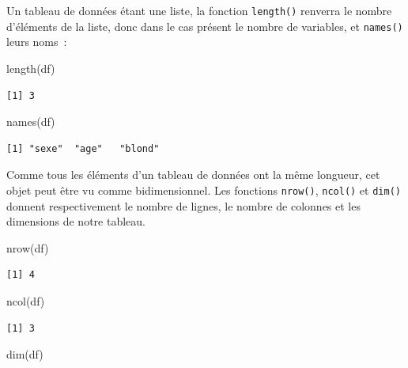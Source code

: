 \documentclass[
  letterpaper,
  DIV=11,
  numbers=noendperiod,
  oneside]{scrreprt}
\newenvironment{Shaded}{\begin{snugshade}}{\end{snugshade}}
\newcommand{\FunctionTok}[1]{\textcolor[rgb]{0.28,0.35,0.67}{#1}}
\newcommand{\NormalTok}[1]{\textcolor[rgb]{0.00,0.23,0.31}{#1}}
\begin{document}
Un tableau de données étant une liste, la fonction \texttt{length()}
renverra le nombre d'éléments de la liste, donc dans le cas présent le
nombre de variables, et \texttt{names()} leurs noms~:

\begin{Shaded}
\begin{Highlighting}[]
\FunctionTok{length}\NormalTok{(df)}
\end{Highlighting}
\end{Shaded}

\begin{verbatim}
[1] 3
\end{verbatim}

\begin{Shaded}
\begin{Highlighting}[]
\FunctionTok{names}\NormalTok{(df)}
\end{Highlighting}
\end{Shaded}

\begin{verbatim}
[1] "sexe"  "age"   "blond"
\end{verbatim}

Comme tous les éléments d'un tableau de données ont la même longueur,
cet objet peut être vu comme bidimensionnel. Les fonctions
\texttt{nrow()}, \texttt{ncol()} et \texttt{dim()} donnent
respectivement le nombre de lignes, le nombre de colonnes et les
dimensions de notre tableau.

\begin{Shaded}
\begin{Highlighting}[]
\FunctionTok{nrow}\NormalTok{(df)}
\end{Highlighting}
\end{Shaded}

\begin{verbatim}
[1] 4
\end{verbatim}

\begin{Shaded}
\begin{Highlighting}[]
\FunctionTok{ncol}\NormalTok{(df)}
\end{Highlighting}
\end{Shaded}

\begin{verbatim}
[1] 3
\end{verbatim}

\begin{Shaded}
\begin{Highlighting}[]
\FunctionTok{dim}\NormalTok{(df)}
\end{Highlighting}
\end{Shaded}
\end{document}
